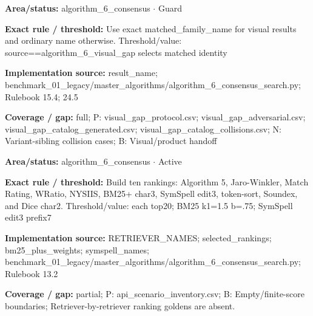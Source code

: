 \begin{tcolorbox}[enhanced,breakable,colback=white,colframe=Muted!45,boxrule=0.45pt,arc=1.5pt,left=6pt,right=6pt,top=5pt,bottom=5pt,title={\texttt{A6-RESULT-IDENTITY-09}},title after break={\texttt{A6-RESULT-IDENTITY-09}\ (continued)},fonttitle=\headingfont\bfseries\color{Navy},coltitle=Navy]
\textbf{Area/status:} algorithm\_\allowbreak{}6\_\allowbreak{}consensus $\boldsymbol{\cdot}$ Guard\par
\smallskip
\textbf{Exact rule / threshold:} Use exact matched\_\allowbreak{}family\_\allowbreak{}name for visual results and ordinary name otherwise. Threshold/\allowbreak{}value: source==algorithm\_\allowbreak{}6\_\allowbreak{}visual\_\allowbreak{}gap selects matched identity\par
\smallskip
\textbf{Implementation source:} result\_\allowbreak{}name; benchmark\_\allowbreak{}01\_\allowbreak{}legacy/\allowbreak{}master\_\allowbreak{}algorithms/\allowbreak{}algorithm\_\allowbreak{}6\_\allowbreak{}consensus\_\allowbreak{}search.py; Rulebook 15.4; 24.5\par
\smallskip
\textbf{Coverage / gap:} full; P: visual\_\allowbreak{}gap\_\allowbreak{}protocol.csv; visual\_\allowbreak{}gap\_\allowbreak{}adversarial.csv; visual\_\allowbreak{}gap\_\allowbreak{}catalog\_\allowbreak{}generated.csv; visual\_\allowbreak{}gap\_\allowbreak{}catalog\_\allowbreak{}collisions.csv; N: Variant-sibling collision cases; B: Visual/\allowbreak{}product handoff
\end{tcolorbox}
\begin{tcolorbox}[enhanced,breakable,colback=white,colframe=Muted!45,boxrule=0.45pt,arc=1.5pt,left=6pt,right=6pt,top=5pt,bottom=5pt,title={\texttt{A6-RETRIEVERS-03}},title after break={\texttt{A6-RETRIEVERS-03}\ (continued)},fonttitle=\headingfont\bfseries\color{Navy},coltitle=Navy]
\textbf{Area/status:} algorithm\_\allowbreak{}6\_\allowbreak{}consensus $\boldsymbol{\cdot}$ Active\par
\smallskip
\textbf{Exact rule / threshold:} Build ten rankings: Algorithm 5, Jaro-Winkler, Match Rating, WRatio, NYSIIS, BM25+ char3, SymSpell edit3, token-sort, Soundex, and Dice char2. Threshold/\allowbreak{}value: each top20; BM25 k1=1.5 b=.75; SymSpell edit3 prefix7\par
\smallskip
\textbf{Implementation source:} RETRIEVER\_\allowbreak{}NAMES; selected\_\allowbreak{}rankings; bm25\_\allowbreak{}plus\_\allowbreak{}weights; symspell\_\allowbreak{}names; benchmark\_\allowbreak{}01\_\allowbreak{}legacy/\allowbreak{}master\_\allowbreak{}algorithms/\allowbreak{}algorithm\_\allowbreak{}6\_\allowbreak{}consensus\_\allowbreak{}search.py; Rulebook 13.2\par
\smallskip
\textbf{Coverage / gap:} partial; P: api\_\allowbreak{}scenario\_\allowbreak{}inventory.csv; B: Empty/\allowbreak{}finite-score boundaries; Retriever-by-retriever ranking goldens are absent.
\end{tcolorbox}
\medskip

